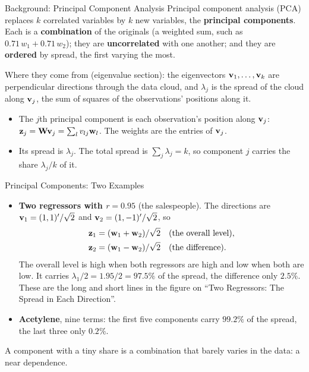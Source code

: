 \begin{frame}{Background: Principal Component Analysis}
    \small
    Principal component analysis (PCA) replaces $k$ correlated variables by $k$ new variables, the \textbf{principal components}. Each is a \textbf{combination} of the originals (a weighted sum, such as $0.71\,w_1+0.71\,w_2$); they are \textbf{uncorrelated} with one another; and they are \textbf{ordered} by spread, the first varying the most.
    \svspace{0.3em}

    Where they come from (eigenvalue section): the eigenvectors $\mathbf{v}_1,\dots,\mathbf{v}_k$ are perpendicular directions through the data cloud, and $\lambda_j$ is the spread of the cloud along $\mathbf{v}_j$, the sum of squares of the observations' positions along it.
    \begin{itemize}
        \item The $j$th principal component is each observation's position along $\mathbf{v}_j$: $\mathbf{z}_j=\mathbf{W}\mathbf{v}_j=\sum_lv_{lj}\mathbf{w}_l$. The weights are the entries of $\mathbf{v}_j$.
        \item Its spread is $\lambda_j$. The total spread is $\sum_j\lambda_j=k$, so component $j$ carries the share $\lambda_j/k$ of it.
    \end{itemize}
\end{frame}


\begin{frame}{Principal Components: Two Examples}
    \small
    \begin{itemize}
        \item \textbf{Two regressors with $r=0.95$} (the salespeople). The directions are $\mathbf{v}_1=(1,1)'/\sqrt2$ and $\mathbf{v}_2=(1,-1)'/\sqrt2$, so
        \begin{align*}
            \mathbf{z}_1&=(\mathbf{w}_1+\mathbf{w}_2)/\sqrt2 && \text{(the overall level)},\\
            \mathbf{z}_2&=(\mathbf{w}_1-\mathbf{w}_2)/\sqrt2 && \text{(the difference)} .
        \end{align*}
        The overall level is high when both regressors are high and low when both are low. It carries $\lambda_1/2=1.95/2=97.5\%$ of the spread, the difference only $2.5\%$. These are the long and short lines in the figure on ``Two Regressors: The Spread in Each Direction''.
        \item \textbf{Acetylene}, nine terms: the first five components carry $99.2\%$ of the spread, the last three only $0.2\%$.
    \end{itemize}
    \svspace{0.5em}
    A component with a tiny share is a combination that barely varies in the data: a near dependence.
\end{frame}


